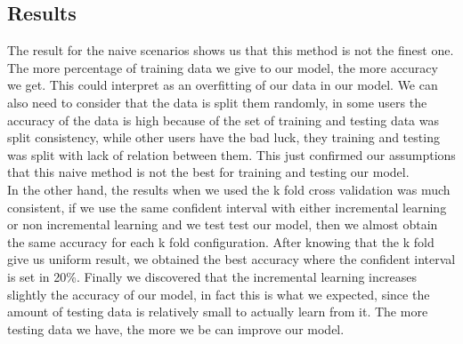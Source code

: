 \subsection{Results}\label{subsec:results}

The result for the naive scenarios shows us that this method is not the finest one. The more percentage of training data we give to our model, the more accuracy we get. This could interpret as an overfitting of our data in our model. We can also need to consider that the data is split them randomly, in some users the accuracy of the data is high because of the set of training and testing data was split consistency, while other users have the bad luck, they training and testing was split with lack of relation between them. This just confirmed our assumptions that this naive method is not the best for training and testing our model.
\\[2ex]
In the other hand, the results when we used the k fold cross validation was much consistent, if we use the same confident interval with either incremental learning or non incremental learning and we test test our model, then we almost obtain the same accuracy for each k fold configuration. After knowing that the k fold give us uniform result, we obtained the best accuracy where the confident interval is set in 20\%. Finally we discovered that the incremental learning increases slightly the accuracy of our model, in fact this is what we expected, since the amount of testing data is relatively small to actually learn from it. The more testing data we have, the more we be can improve our model.